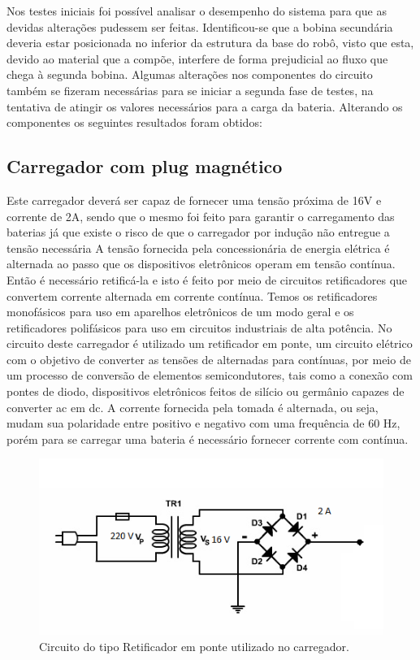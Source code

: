 Nos testes iniciais foi possível analisar o desempenho do sistema para que as devidas alterações pudessem ser feitas. 
Identificou-se que a bobina secundária deveria estar posicionada no inferior da estrutura da base do robô, visto que esta, devido ao material que a compõe, interfere de forma prejudicial ao fluxo que chega à segunda bobina. 
Algumas alterações nos componentes do circuito também se fizeram necessárias para se iniciar a segunda fase de testes, na tentativa de atingir os valores necessários para a carga da bateria.
Alterando os componentes os seguintes resultados foram obtidos:

\subsection{Carregador com plug magnético}

Este carregador deverá ser capaz de fornecer uma tensão próxima de 16V e corrente de 2A, sendo que o mesmo foi feito para garantir o carregamento das baterias já que existe o risco de que o carregador por indução não entregue a tensão necessária
A tensão fornecida pela concessionária de energia elétrica é alternada ao passo que os dispositivos eletrônicos operam em tensão contínua. Então é necessário retificá-la e isto é feito por meio de circuitos retificadores que convertem corrente alternada em corrente contínua. Temos os retificadores monofásicos para uso em aparelhos eletrônicos de um modo geral e os retificadores polifásicos para uso em circuitos industriais de alta potência. 
No circuito deste carregador é utilizado um retificador em ponte, um circuito elétrico com o objetivo de converter as tensões de alternadas para contínuas, por meio de um processo de conversão de elementos semicondutores, tais como a conexão com pontes de diodo, dispositivos eletrônicos feitos de silício ou germânio capazes de converter ac em dc. A corrente fornecida pela tomada é alternada, ou seja, mudam sua polaridade entre positivo e negativo com uma frequência de 60 Hz, porém para se carregar uma bateria é necessário fornecer corrente com contínua.

 \begin{figure}[H]
	\centering
	\includegraphics[scale=0.5]{figuras/circuitoretificadorcarregador}
	\caption{Circuito do tipo Retificador em ponte utilizado no carregador.}
	\label{img:circuitoretificadorcarregador}
\end{figure}

